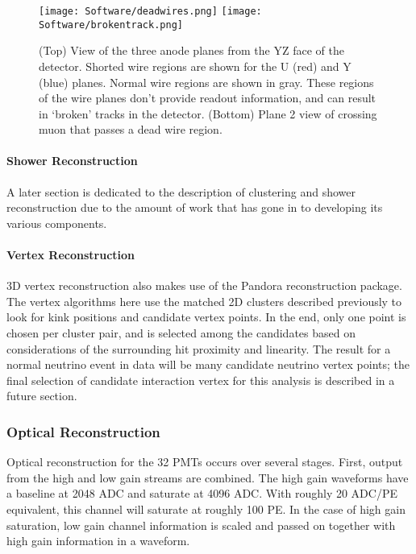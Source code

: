 \begin{figure}[h!]
\centering
\texttt{[image: Software/deadwires.png]}
\texttt{[image: Software/brokentrack.png]}
\caption{(Top) View of the three anode planes from the YZ face of the detector. Shorted wire regions are shown for the U (red) and Y (blue) planes.  Normal wire regions are shown in gray. These regions of the wire planes don't provide readout information, and can result in `broken' tracks in the detector. (Bottom) Plane 2 view of crossing muon that passes a dead wire region.  } 
\label{fig:brokentracks}
\end{figure}

\paragraph{Shower Reconstruction}
A later section is dedicated to the description of clustering and shower reconstruction due to the amount of work that has gone in to developing its various components.

\paragraph{Vertex Reconstruction}
3D vertex reconstruction also makes use of the Pandora reconstruction package. The vertex algorithms here use the matched 2D clusters described previously to look for kink positions and candidate vertex points. In the end, only one point is chosen per cluster pair, and is selected among the candidates based on considerations of the surrounding hit proximity and linearity. The result for a normal neutrino event in data will be many candidate neutrino vertex points; the final selection of candidate interaction vertex for this analysis is described in a future section.

\subsubsection{Optical Reconstruction} 
Optical reconstruction for the 32 PMTs occurs over several stages. First, output from the high and low gain streams are combined.  The high gain waveforms have a baseline at 2048 ADC and saturate at 4096 ADC.  With roughly 20 ADC/PE equivalent, this channel will saturate at roughly 100 PE.  In the case of high gain saturation, low gain channel information is scaled and passed on together with high gain information in a waveform. 


